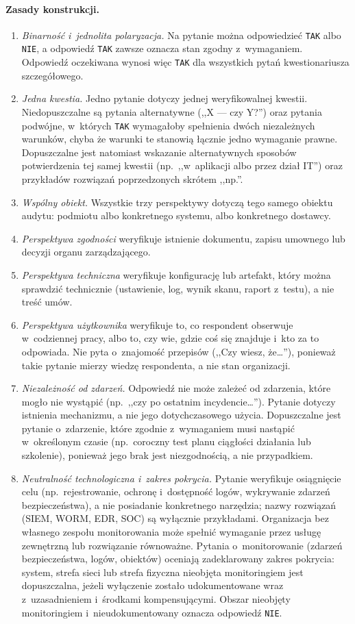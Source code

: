 \paragraph{Zasady konstrukcji.}
\begin{enumerate}[label=(Z\arabic*)]
  \item \textit{Binarność i~jednolita polaryzacja.} Na pytanie można odpowiedzieć \texttt{TAK} albo \texttt{NIE}, a odpowiedź \texttt{TAK} zawsze oznacza stan zgodny z~wymaganiem. Odpowiedź oczekiwana wynosi więc \texttt{TAK} dla wszystkich pytań kwestionariusza szczegółowego.
  \item \textit{Jedna kwestia.} Jedno pytanie dotyczy jednej weryfikowalnej kwestii. Niedopuszczalne są pytania alternatywne (,,X --- czy Y?'') oraz pytania podwójne, w~których \texttt{TAK} wymagałoby spełnienia dwóch niezależnych warunków, chyba że warunki te stanowią łącznie jedno wymaganie prawne. Dopuszczalne jest natomiast wskazanie alternatywnych sposobów potwierdzenia tej samej kwestii (np.\ ,,w~aplikacji albo przez dział IT'') oraz przykładów rozwiązań poprzedzonych skrótem ,,np.''.
  \item \textit{Wspólny obiekt.} Wszystkie trzy perspektywy dotyczą tego samego obiektu audytu: podmiotu albo konkretnego systemu, albo konkretnego dostawcy.
  \item \textit{Perspektywa zgodności} weryfikuje istnienie dokumentu, zapisu umownego lub decyzji organu zarządzającego.
  \item \textit{Perspektywa techniczna} weryfikuje konfigurację lub artefakt, który można sprawdzić technicznie (ustawienie, log, wynik skanu, raport z~testu), a nie treść umów.
  \item \textit{Perspektywa użytkownika} weryfikuje to, co respondent obserwuje w~codziennej pracy, albo to, czy wie, gdzie coś się znajduje i~kto za to odpowiada. Nie pyta o~znajomość przepisów (,,Czy wiesz, że\ldots''), ponieważ takie pytanie mierzy wiedzę respondenta, a nie stan organizacji.
  \item \textit{Niezależność od zdarzeń.} Odpowiedź nie może zależeć od zdarzenia, które mogło nie wystąpić (np.\ ,,czy po ostatnim incydencie\ldots''). Pytanie dotyczy istnienia mechanizmu, a nie jego dotychczasowego użycia. Dopuszczalne jest pytanie o~zdarzenie, które zgodnie z~wymaganiem musi nastąpić w~określonym czasie (np.\ coroczny test planu ciągłości działania lub szkolenie), ponieważ jego brak jest niezgodnością, a nie przypadkiem.
  \item \textit{Neutralność technologiczna i~zakres pokrycia.} Pytanie weryfikuje osiągnięcie celu (np.\ rejestrowanie, ochronę i~dostępność logów, wykrywanie zdarzeń bezpieczeństwa), a nie posiadanie konkretnego narzędzia; nazwy rozwiązań (SIEM, WORM, EDR, SOC) są wyłącznie przykładami. Organizacja bez własnego zespołu monitorowania może spełnić wymaganie przez usługę zewnętrzną lub rozwiązanie równoważne. Pytania o~monitorowanie (zdarzeń bezpieczeństwa, logów, obiektów) oceniają zadeklarowany zakres pokrycia: system, strefa sieci lub strefa fizyczna nieobjęta monitoringiem jest dopuszczalna, jeżeli wyłączenie zostało udokumentowane wraz z~uzasadnieniem i~środkami kompensującymi. Obszar nieobjęty monitoringiem i~nieudokumentowany oznacza odpowiedź \texttt{NIE}.

\end{enumerate}
